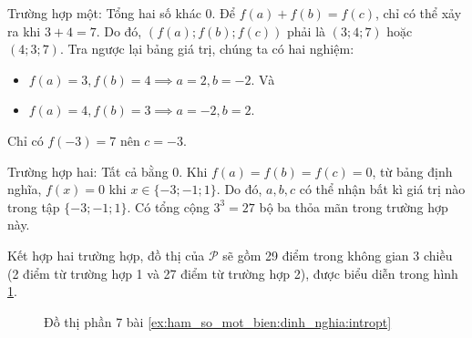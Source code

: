 \textcolor{colorEmphasis}{Trường hợp một}: Tổng hai số khác 0. Để $f(a) + f(b) = f(c)$, chỉ có thể xảy ra khi $3 + 4 = 7$. Do đó, $(f(a); f(b); f(c))$ phải là $(3; 4; 7)$ hoặc $(4; 3; 7)$. Tra ngược lại bảng giá trị, chúng ta có hai nghiệm:
   \begin{itemize}
      \item $f(a)=3, f(b)=4 \implies a=2, b=-2$. Và
      \item $f(a)=4, f(b)=3 \implies a=-2, b=2$.
   \end{itemize}

Chỉ có $f(-3) = 7$ nên $c = -3$.

\textcolor{colorEmphasisCyan}{Trường hợp hai}: Tất cả bằng 0. Khi $f(a) = f(b) = f(c) = 0$, từ bảng định nghĩa, $f(x)=0$ khi $x \in \{-3; -1; 1\}$. Do đó, $a, b, c$ có thể nhận bất kì giá trị nào trong tập $\{-3; -1; 1\}$. Có tổng cộng $3^3 = 27$ bộ ba thỏa mãn trong trường hợp này.

Kết hợp hai trường hợp, đồ thị của $\mathcal{P}$ sẽ gồm 29 điểm trong không gian 3 chiều (2 điểm từ trường hợp 1 và 27 điểm từ trường hợp 2), được biểu diễn trong hình \ref{fig:ham_so_mot_bien:dinh_nghia:dtp8}.

\begin{figure}[H]
   \centering
   \caption{Đồ thị phần 7 bài \ref{ex:ham_so_mot_bien:dinh_nghia:intropt}}
   \label{fig:ham_so_mot_bien:dinh_nghia:dtp8}
\end{figure}

